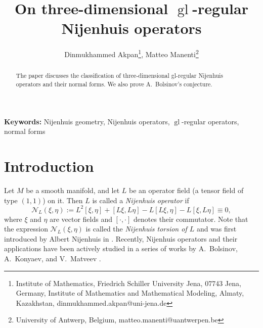 \documentclass[12pt]{article}
\title{On three-dimensional $\operatorname{gl}$-regular Nijenhuis operators}
\author{Dinmukhammed Akpan\footnote{Institute of Mathematics, Friedrich Schiller University Jena, 07743 Jena, Germany, Institute of Mathematics and Mathematical Modeling, Almaty, Kazakhstan, dinmukhammed.akpan@uni-jena.de}, Matteo Manenti\footnote{University of Antwerp, Belgium, matteo.manenti@uantwerpen.be}}
\theoremstyle{plain}
\begin{document}
\maketitle
\begin{abstract}
 The paper discusses the classification of three-dimensional gl-regular Nijenhuis operators and their normal forms. We also prove A.~Bolsinov's conjecture.
\end{abstract}

\noindent
\textbf{Keywords:} Nijenhuis geometry, Nijenhuis operators, $\operatorname{gl}$-regular operators, normal forms



\section*{Introduction}

Let $M$ be a smooth manifold, and let $L$ be an operator field (a tensor field of type $(1,1)$) on it. Then $L$ is called a \emph{Nijenhuis operator} if  
\begin{equation*}
    \mathcal{N}_{L}(\xi,\eta):={L}^2[\xi,\eta]+[{L}\xi,{L}\eta]-{L}[{L}\xi,\eta]-{L}[\xi,{L}\eta] \equiv 0,
\end{equation*}
where $\xi$ and $\eta$ are vector fields and $[\cdot,\cdot]$ denotes their commutator. Note that the expression $\mathcal{N}_{L}(\xi,\eta)$ is called the \emph{Nijenhuis torsion of $L$} and was first introduced by Albert Nijenhuis in \cite{nijenhuis1951xn}. Recently, Nijenhuis operators and their applications have been actively studied in a series of works by A.~Bolsinov, A.~Konyaev, and V.~Matveev \cite{bolsinov2022nijenhuisNGI, konyaev2021nijenhuisNGII, bolsinov2024nijenhuisNGIII, bolsinov2024nijenhuisNGIV}.
\end{document}
